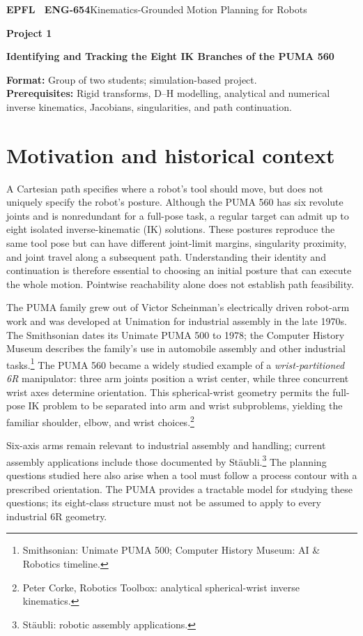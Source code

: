 \documentclass[11pt,a4paper]{article}
\begin{document}
{\small\textbf{EPFL \textbar\ ENG-654}\hfill Kinematics-Grounded Motion Planning for Robots}
\vspace{5mm}

{\color{epflred}\Large\bfseries Project 1}

{\LARGE\bfseries Identifying and Tracking the Eight IK Branches of the PUMA 560\par}

\textbf{Format:} Group of two students; simulation-based project.\\
\textbf{Prerequisites:} Rigid transforms, D--H modelling, analytical and numerical
inverse kinematics, Jacobians, singularities, and path continuation.

\section*{Motivation and historical context}
A Cartesian path specifies where a robot's tool should move, but does not uniquely
specify the robot's posture. Although the PUMA 560 has six revolute joints and is
nonredundant for a full-pose task, a regular target can admit up to eight isolated
inverse-kinematic (IK) solutions. These postures reproduce the same tool pose but
can have different joint-limit margins, singularity proximity, and joint travel
along a subsequent path. Understanding their identity and continuation is therefore
essential to choosing an initial posture that can execute the whole motion.
Pointwise reachability alone does not establish path feasibility.

The PUMA family grew out of Victor Scheinman's electrically driven robot-arm work
and was developed at Unimation for industrial assembly in the late 1970s. The
Smithsonian dates its Unimate PUMA 500 to 1978; the Computer History Museum
describes the family's use in automobile assembly and other industrial
tasks.\footnote{Smithsonian: Unimate PUMA 500; Computer History Museum:
AI \& Robotics timeline.}
The PUMA 560 became a widely studied example of a \emph{wrist-partitioned 6R}
manipulator: three arm joints position a wrist center, while three concurrent
wrist axes determine orientation. This spherical-wrist geometry permits the
full-pose IK problem to be separated into arm and wrist subproblems, yielding
the familiar shoulder, elbow, and wrist choices.\footnote{Peter Corke,
Robotics Toolbox: analytical spherical-wrist inverse kinematics.}

Six-axis arms remain relevant to industrial assembly and handling; current
assembly applications include those documented by
St\"aubli.\footnote{St\"aubli: robotic assembly applications.}
The planning questions studied here also arise when a tool must follow a process
contour with a prescribed orientation. The PUMA provides a tractable model for
studying these questions; its eight-class structure must not be assumed to apply
to every industrial 6R geometry.
\end{document}
